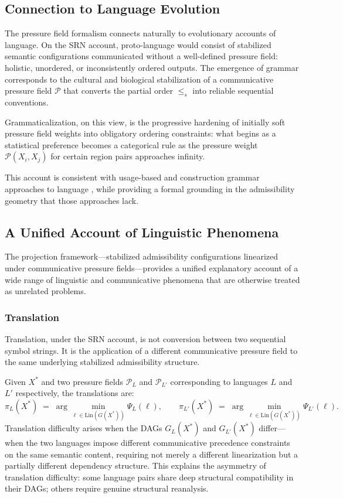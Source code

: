 \documentclass[11pt, a4paper]{article}
\theoremstyle{srn}
\theoremstyle{srnremark}
\begin{document}
\subsection{Connection to Language Evolution}

The pressure field formalism connects naturally to evolutionary
accounts of language.
On the SRN account, proto-language would consist of stabilized
semantic configurations communicated without a well-defined pressure
field: holistic, unordered, or inconsistently ordered outputs.
The emergence of grammar corresponds to the cultural and biological
stabilization of a communicative pressure field $\mathcal{P}$ that
converts the partial order $\leq_s$ into reliable sequential
conventions.

Grammaticalization, on this view, is the progressive hardening of
initially soft pressure field weights into obligatory ordering
constraints: what begins as a statistical preference becomes a
categorical rule as the pressure weight $\mathcal{P}(X_i, X_j)$ for
certain region pairs approaches infinity.

This account is consistent with usage-based and construction grammar
approaches to language \citep{smolensky1986harmony}, while providing
a formal grounding in the admissibility geometry that those approaches
lack.


\subsection{A Unified Account of Linguistic Phenomena}

The projection framework---stabilized admissibility configurations
linearized under communicative pressure fields---provides a unified
explanatory account of a wide range of linguistic and communicative
phenomena that are otherwise treated as unrelated problems.

\subsubsection*{Translation}

Translation, under the SRN account, is not conversion between two
sequential symbol strings.
It is the application of a different communicative pressure field to
the same underlying stabilized admissibility structure.

Given $X^*$ and two pressure fields $\mathcal{P}_L$ and
$\mathcal{P}_{L'}$ corresponding to languages $L$ and $L'$
respectively, the translations are:
\[
  \pi_L(X^*) \;=\; \arg\min_{\ell \in \mathrm{Lin}(G(X^*))} \Psi_L(\ell),
  \qquad
  \pi_{L'}(X^*) \;=\; \arg\min_{\ell \in \mathrm{Lin}(G(X^*))} \Psi_{L'}(\ell).
\]
Translation difficulty arises when the DAGs $G_L(X^*)$ and
$G_{L'}(X^*)$ differ---when the two languages impose different
communicative precedence constraints on the same semantic content,
requiring not merely a different linearization but a partially
different dependency structure.
This explains the asymmetry of translation difficulty: some language
pairs share deep structural compatibility in their DAGs; others
require genuine structural reanalysis.
\end{document}
